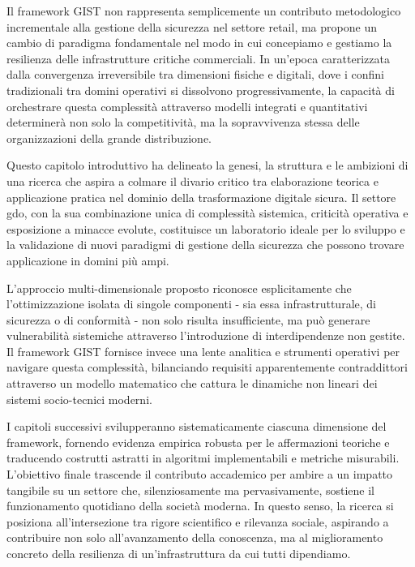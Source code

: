 Il framework GIST non rappresenta semplicemente un contributo metodologico incrementale alla gestione della sicurezza nel settore retail, ma propone un cambio di paradigma fondamentale nel modo in cui concepiamo e gestiamo la resilienza delle infrastrutture critiche commerciali. In un'epoca caratterizzata dalla convergenza irreversibile tra dimensioni fisiche e digitali, dove i confini tradizionali tra domini operativi si dissolvono progressivamente, la capacità di orchestrare questa complessità attraverso modelli integrati e quantitativi determinerà non solo la competitività, ma la sopravvivenza stessa delle organizzazioni della grande distribuzione.

Questo capitolo introduttivo ha delineato la genesi, la struttura e le ambizioni di una ricerca che aspira a colmare il divario critico tra elaborazione teorica e applicazione pratica nel dominio della trasformazione digitale sicura. Il settore \gls{gdo}, con la sua combinazione unica di complessità sistemica, criticità operativa e esposizione a minacce evolute, costituisce un laboratorio ideale per lo sviluppo e la validazione di nuovi paradigmi di gestione della sicurezza che possono trovare applicazione in domini più ampi.

L'approccio multi-dimensionale proposto riconosce esplicitamente che l'ottimizzazione isolata di singole componenti - sia essa infrastrutturale, di sicurezza o di conformità - non solo risulta insufficiente, ma può generare vulnerabilità sistemiche attraverso l'introduzione di interdipendenze non gestite. Il framework GIST fornisce invece una lente analitica e strumenti operativi per navigare questa complessità, bilanciando requisiti apparentemente contraddittori attraverso un modello matematico che cattura le dinamiche non lineari dei sistemi socio-tecnici moderni.

I capitoli successivi svilupperanno sistematicamente ciascuna dimensione del framework, fornendo evidenza empirica robusta per le affermazioni teoriche e traducendo costrutti astratti in algoritmi implementabili e metriche misurabili. L'obiettivo finale trascende il contributo accademico per ambire a un impatto tangibile su un settore che, silenziosamente ma pervasivamente, sostiene il funzionamento quotidiano della società moderna. In questo senso, la ricerca si posiziona all'intersezione tra rigore scientifico e rilevanza sociale, aspirando a contribuire non solo all'avanzamento della conoscenza, ma al miglioramento concreto della resilienza di un'infrastruttura da cui tutti dipendiamo.

\clearpage
\printbibliography[
    heading=subbibliography,
    title={Riferimenti Bibliografici del Capitolo 1},
]

